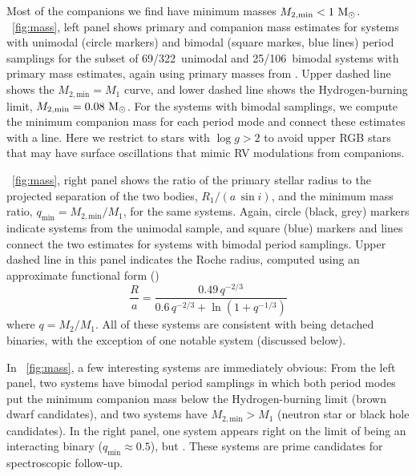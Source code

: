 \documentclass[modern, letterpaper]{aastex62}
\newcommand{\logg}{\ensuremath{\log g}}
\newcommand{\nbimodal}{106}
\newcommand{\nunimodal}{322}
\begin{document}
Most of the companions we find have minimum masses $M_{2, \textrm{min}} <
1~\mathrm{M}_\odot$.
\figurename~\ref{fig:mass}, left panel shows primary and companion mass
estimates for systems with unimodal (circle markers) and bimodal (square markes,
blue lines) period samplings for the subset of 69/\nunimodal\ unimodal and
25/\nbimodal\ bimodal systems with primary mass estimates, again using primary
masses from \citet{Ness:2015}.
Upper dashed line shows the $M_{2, \textrm{min}} = M_1$ curve, and lower dashed
line shows the Hydrogen-burning limit, $M_{2, \textrm{min}} = 0.08~\mathrm{M}_\odot$.
For the systems with bimodal samplings, we compute the minimum companion mass
for each period mode and connect these estimates with a line.
Here we restrict to stars with $\logg > 2$ to avoid upper RGB stars that may
have surface oscillations that mimic RV modulations from companions.

\figurename~\ref{fig:mass}, right panel shows the ratio of the primary stellar
radius to the projected separation of the two bodies, $R_1 / (a\,\sin i)$, and
the minimum mass ratio, $q_{\textrm{min}} = M_{2, \textrm{min}} / M_1$, for the
same systems.
Again, circle (black, grey) markers indicate systems from the unimodal sample,
and square (blue) markers and lines connect the two estimates for systems with
bimodal period samplings.
Upper dashed line in this panel indicates the Roche radius, computed using an
approximate functional form (\citealt{Eggleton:1983})
\begin{equation}
    \frac{R}{a} = \frac{0.49\,q^{-2/3}}{0.6\,q^{-2/3} +
        \ln\left(1 + q^{-1/3}\right)}
\end{equation}
where $q = M_2 / M_1$.
All of these systems are consistent with being detached binaries, with the
exception of one notable system (discussed below).

In \figurename~\ref{fig:mass}, a few interesting systems are immediately
obvious: From the left panel, two systems have bimodal period samplings in which
both period modes put the minimum companion mass below the Hydrogen-burning
limit (brown dwarf candidates), and two systems have $M_{2, \textrm{min}} > M_1$
(neutron star or black hole candidates).
In the right panel, one system appears right on the limit of being an
interacting binary ($q_{\textrm{min}} \approx 0.5$), but .
These systems are prime candidates for spectroscopic follow-up.
\end{document}
